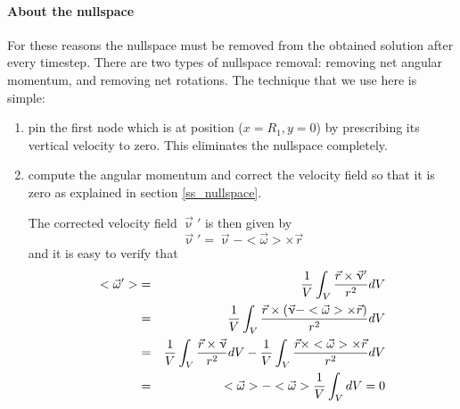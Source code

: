 \paragraph{About the nullspace}
For these reasons the nullspace must be removed from the obtained solution after every timestep.
There are two types of nullspace removal: removing net angular momentum, and removing net rotations.
The technique that we use here is simple:
\begin{enumerate}
\item pin the first node which is at position ($x=R_1,y=0$) by prescribing its vertical velocity to zero. This 
eliminates the nullspace completely. 
\item compute the angular momentum and correct the velocity field so that it is zero as explained in section \ref{ss_nullspace}.


The corrected velocity field $\vec{\upnu}'$ is then given by 
\[
\vec{\upnu}' = \vec{\upnu} - <\vec\omega>\times \vec{r}
\]
and it is easy to verify that 
\begin{eqnarray}
<{\vec\omega}'> 
&=& \frac{1}{V} \int_V \frac{{\vec r}\times {\vec\upnu}'}{r^2} dV \nonumber\\
&=& \frac{1}{V} \int_V \frac{{\vec r}\times (\vec{\upnu} - <\vec\omega>\times \vec{r})   }{r^2} dV\nonumber\\
&=& \frac{1}{V} \int_V \frac{{\vec r}\times \vec{\upnu}    }{r^2} dV
- \frac{1}{V} \int_V \frac{{\vec r}\times  <\vec\omega>\times \vec{r}   }{r^2} dV\nonumber\\
&=&  <{\vec\omega}> -  <{\vec\omega}> \frac{1}{V} \int_V dV = 0
\end{eqnarray}

\end{enumerate}



